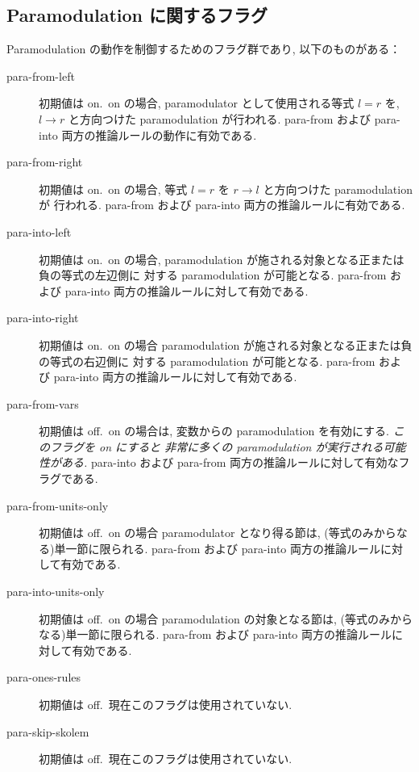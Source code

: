\subsection{Paramodulation に関するフラグ}
\label{sec:para-flags}
Paramodulation の動作を制御するためのフラグ群であり,
以下のものがある：
\begin{description}
\item[para-from-left] 初期値は on.\ on の場合, 
  paramodulator として使用される等式 $l = r$ を,
 $l\rightarrow r$ と方向つけた paramodulation が行われる.
  para-from および para-into 両方の推論ルールの動作に有効である.
\item[para-from-right] 初期値は on.\ on の場合,
  等式 $l = r$ を $r\rightarrow l$ と方向つけた paramodulation が
  行われる. para-from および para-into 両方の推論ルールに有効である.
\item[para-into-left] 初期値は on.\ on の場合,
  paramodulation が施される対象となる正または負の等式の左辺側に
  対する paramodulation が可能となる. para-from および para-into
  両方の推論ルールに対して有効である.
\item[para-into-right] 初期値は on.\ on の場合
  paramodulation が施される対象となる正または負の等式の右辺側に
  対する paramodulation が可能となる. para-from および para-into
  両方の推論ルールに対して有効である.
\item[para-from-vars] 初期値は off.\ on の場合は, 変数からの
  paramodulation を有効にする. \emph{このフラグを on にすると
    非常に多くの paramodulation が実行される可能性がある.}
  para-into および para-from 両方の推論ルールに対して有効なフラグである.
\item[para-from-units-only] 初期値は off.\ on の場合
  paramodulator となり得る節は, (等式のみからなる)単一節に限られる.
  para-from および para-into 両方の推論ルールに対して有効である.
\item[para-into-units-only] 初期値は off.\ on の場合
  paramodulation の対象となる節は, (等式のみからなる)単一節に限られる.
  para-from および para-into 両方の推論ルールに対して有効である.
\item[para-ones-rules] 初期値は off.\ 現在このフラグは使用されていない.
\item[para-skip-skolem] 初期値は off.\ 現在このフラグは使用されていない.
\end{description}

